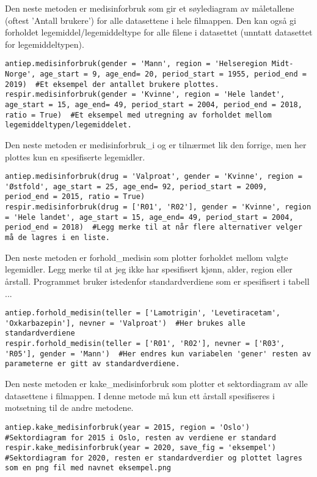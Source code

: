 \documentclass[12pt,norsk,a4paper,fleqn]{article}
\numberwithin{equation}{section}
\begin{document}
Den neste metoden er {\color{blue}medisinforbruk} som gir et søylediagram av måletallene (oftest 'Antall brukere') for alle datasettene i hele filmappen. Den kan også gi forholdet legemiddel/legemiddeltype for alle filene i datasettet (unntatt datasettet for legemiddeltypen).
\begin{lstlisting}
antiep.medisinforbruk(gender = 'Mann', region = 'Helseregion Midt-Norge', age_start = 9, age_end= 20, period_start = 1955, period_end = 2019)  #Et eksempel der antallet brukere plottes.
respir.medisinforbruk(gender = 'Kvinne', region = 'Hele landet', age_start = 15, age_end= 49, period_start = 2004, period_end = 2018, ratio = True)  #Et eksempel med utregning av forholdet mellom legemiddeltypen/legemiddelet.
\end{lstlisting}
Den neste metoden er {\color{blue}medisinforbruk\_i} og er tilnærmet lik den forrige, men her plottes kun en spesifiserte legemidler.
\begin{lstlisting}
antiep.medisinforbruk(drug = 'Valproat', gender = 'Kvinne', region = 'Østfold', age_start = 25, age_end= 92, period_start = 2009, period_end = 2015, ratio = True)
respir.medisinforbruk(drug = ['R01', 'R02'], gender = 'Kvinne', region = 'Hele landet', age_start = 15, age_end= 49, period_start = 2004, period_end = 2018)  #Legg merke til at når flere alternativer velger må de lagres i en liste.
\end{lstlisting}
Den neste metoden er {\color{blue}forhold\_medisin} som plotter forholdet mellom valgte legemidler. Legg merke til at jeg ikke har spesifisert kjønn, alder, region eller årstall. Programmet bruker istedenfor standardverdiene som er spesifisert i tabell ...
\begin{lstlisting}
antiep.forhold_medisin(teller = ['Lamotrigin', 'Levetiracetam', 'Oxkarbazepin'], nevner = 'Valproat')  #Her brukes alle standardverdiene
respir.forhold_medisin(teller = ['R01', 'R02'], nevner = ['R03', 'R05'], gender = 'Mann')  #Her endres kun variabelen 'gener' resten av parameterne er gitt av standardverdiene.
\end{lstlisting}
Den neste metoden er {\color{blue}kake\_medisinforbruk} som plotter et sektordiagram av alle datasettene i filmappen. I denne metode må kun ett årstall spesifiseres i motsetning til de andre metodene.
\begin{lstlisting}
antiep.kake_medisinforbruk(year = 2015, region = 'Oslo')  #Sektordiagram for 2015 i Oslo, resten av verdiene er standard
respir.kake_medisinforbruk(year = 2020, save_fig = 'eksempel')  #Sektordiagram for 2020, resten er standardverdier og plottet lagres som en png fil med navnet eksempel.png
\end{lstlisting}
\end{document}
